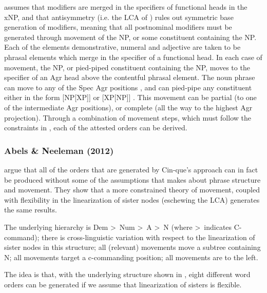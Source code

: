 \documentclass[output=paper
,modfonts
,nonflat]{langsci/langscibook}
\begin{document}
\citeauthor{Cinque2005} assumes that modifiers are merged in the specifiers of functional heads in the xNP, and that antisymmetry (i.e. the LCA of \citealt{Kayne1994})  rules out symmetric base generation of modifiers, meaning that all postnominal modifiers must be generated through movement of the NP, or some constituent containing the NP. Each of the elements demonstrative, numeral and adjective are taken to be phrasal elements which merge in the specifier of a functional head. In each case of movement, the NP, or pied-piped constituent containing the NP, moves to the specifier of an Agr head above the contentful phrasal element. The noun phrase can move to any of the Spec Agr positions , and can pied-pipe any constituent either in the form [NP[XP]]  or [XP[NP]] . This movement can be partial (to one of the intermediate Agr positions), or complete (all the way to the highest Agr projection). Through a combination of movement steps, which must follow the constraints in , each of the attested orders can be derived.

\subsubsection{Abels \& Neeleman (2012)}

\citet{AbelsNeeleman2012} argue that all of the orders that are generated by Cin\hyp{}que's approach can in fact be produced without some of the assumptions that \citeauthor{Cinque2005} makes about phrase structure and movement. They show that a more constrained theory of movement, coupled with flexibility in the linearization of sister nodes (eschewing the LCA) generates the same results. 

\ea \label{ex:hall:57}
\ea The underlying hierarchy is Dem \textgreater\ Num \textgreater\ A \textgreater\ N (where \textgreater\ indicates C-command);
\ex there is cross-linguistic variation with respect to the linearization of sister nodes in this structure;
\ex all (relevant) movements move a subtree containing N;
\ex all movements target a c-commanding position;
\ex all movements are to the left.
\z 
\z

The idea is that, with the underlying structure shown in , eight different word orders can be generated if we assume that linearization of sisters is flexible.
\end{document}
